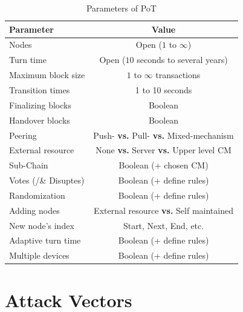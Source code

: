 \begin{enumerate}
	\begin{table}[!b]
		\centering
		\begin{tabularx}{0.69\textwidth}{ l | c }
			\textbf{Parameter} & \textbf{Value} \\ \hline
			Nodes & Open ($1$ to $\infty$) \\ \hline
			Turn time & Open ($10$ seconds to several years) \\ \hline
			Maximum block size & $1$ to $\infty$ transactions \\ \hline
			Transition times & 1 to 10 seconds \\ \hline
			Finalizing blocks & Boolean \\ \hline
			Handover blocks & Boolean \\ \hline
			Peering & Push- \textbf{vs.} Pull- \textbf{vs.} Mixed-mechanism \\ \hline
			External resource & None \textbf{vs.} Server \textbf{vs.} Upper level \gls{CM} \\ \hline
			Sub-Chain & Boolean (+ chosen \gls{CM}) \\ \hline
			Votes (/\& Disuptes) & Boolean (+ define rules) \\ \hline
			Randomization & Boolean (+ define rules) \\ \hline
			Adding nodes & External resource \textbf{vs.} Self maintained \\ \hline
			New node's index & Start, Next, End, etc. \\ \hline
			Adaptive turn time & Boolean (+ define rules) \\ \hline
			Multiple devices & Boolean (+ define rules) \\ \hline
			\hline
		\end{tabularx}
		\caption{Parameters of \gls{PoT}}
		\label{tbl:PoTparameters}
	\end{table}
	
	
	
\end{enumerate}



\FloatBarrier

\section{Attack Vectors}
\label{sec:AttackVectors}


